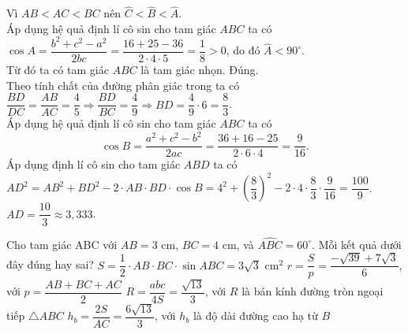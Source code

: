 \begin{ex}
{\begin{itemchoice}
			Vì $AB < AC < BC$ nên $\widehat{C}  < \widehat{B} < \widehat{A}$.\\
			Áp dụng hệ quả định lí  cô sin cho tam giác $ABC$ ta có\\
			$\cos A=\dfrac{b^2+c^2-a^2}{2bc}=\dfrac{16+25-36}{2\cdot 4\cdot 5}=\dfrac{1}{8}> 0$, do đó $\widehat{A} <  90^\circ$.\\
			Từ đó ta có tam giác $ABC$  là tam giác nhọn.
			 \itemch Đúng.\\
			Theo tính chất của đường phân giác trong ta có $\dfrac{BD}{DC}=\dfrac{AB}{AC}=\dfrac{4}{5}\Rightarrow\dfrac{BD}{BC}=\dfrac{4}{9}\Rightarrow  BD=\dfrac{4}{9}\cdot 6=\dfrac{8}{3}$.\\
			Áp dụng hệ quả  định lí cô sin cho tam giác $ABC$ ta có
			 \[\cos B=\dfrac{a^2+c^2-b^2}{2ac}=\dfrac{36+16-25}{2\cdot 6\cdot 4}=\dfrac{9}{16}.\]
			Áp  dụng định lí cô sin cho tam giác $ABD$ ta có\\
			$AD^2=AB^2+BD^2-2\cdot AB\cdot BD\cdot\cos  B=4^2+\left(\dfrac{8}{3}\right)^2-2\cdot 4\cdot\dfrac{8}{3}\cdot\dfrac{9}{16}=\dfrac{100}{9}$.\\
			$AD=\dfrac{10}{3}\approx 3{,}333$. 
		\end{itemchoice}
	 }
\end{ex}

\begin{ex}%
	Cho tam giác ABC với $AB = 3$ cm, $BC = 4$ cm, và $\widehat{ABC} =  60^{\circ}$. Mỗi kết quả dưới đây đúng hay sai?
	 \choiceTF
		{\True $S =\dfrac{1}{2} \cdot AB \cdot BC \cdot \sin ABC =  3\sqrt{3}$ cm$^2$}
		{\True  $r=\dfrac{S}{p}=\dfrac{-\sqrt{39}+7\sqrt{3}}{6}$, với $p=\dfrac{AB+BC+AC}{2}$}
		{$R =\dfrac{abc}{4S} = \dfrac{\sqrt{13}}{3}$, với $R$ là bán kính đường tròn ngoại tiếp $\triangle ABC$} 
		 {$h_b=\dfrac{2S}{AC}=\dfrac{6\sqrt{13}}{3}$, với $h_b$ là độ dài đường cao hạ từ $B$}
\end{ex}


